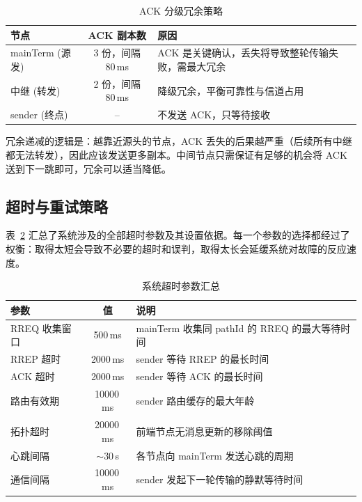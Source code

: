 \documentclass[12pt,a4paper]{ctexart}
\newcommand{\tblheaderstyle}{\sffamily\small\color{white}}
\begin{document}
\begin{table}[htbp]
\centering
\caption{ACK 分级冗余策略}
\label{tab:ackredundancy}
\begin{tabularx}{\textwidth}{l c >{\raggedright\arraybackslash}X}
\toprule
\rowcolor{tblhead}\tblheaderstyle 节点 & \tblheaderstyle ACK 副本数 & \tblheaderstyle 原因 \\
\midrule
mainTerm (源发) & 3 份，间隔 80\,ms & ACK 是关键确认，丢失将导致整轮传输失败，需最大冗余 \\
中继 (转发)    & 2 份，间隔 80\,ms & 降级冗余，平衡可靠性与信道占用 \\
sender (终点)  & --                & 不发送 ACK，只等待接收 \\
\bottomrule
\end{tabularx}
\end{table}

冗余递减的逻辑是：越靠近源头的节点，ACK 丢失的后果越严重（后续所有中继都无法转发），因此应该发送更多副本。中间节点只需保证有足够的机会将 ACK 送到下一跳即可，冗余可以适当降低。

\subsection{超时与重试策略}

表~\ref{tab:timeouts} 汇总了系统涉及的全部超时参数及其设置依据。每一个参数的选择都经过了权衡：取得太短会导致不必要的超时和误判，取得太长会延缓系统对故障的反应速度。

\begin{table}[htbp]
\centering
\caption{系统超时参数汇总}
\label{tab:timeouts}
\begin{tabularx}{\textwidth}{l c >{\raggedright\arraybackslash}X}
\toprule
\rowcolor{tblhead}\tblheaderstyle 参数 & \tblheaderstyle 值 & \tblheaderstyle 说明 \\
\midrule
RREQ 收集窗口  & 500\,ms    & mainTerm 收集同 pathId 的 RREQ 的最大等待时间 \\
RREP 超时     & 2000\,ms   & sender 等待 RREP 的最长时间 \\
ACK 超时      & 2000\,ms   & sender 等待 ACK 的最长时间 \\
路由有效期     & 10000\,ms  & sender 路由缓存的最大年龄 \\
拓扑超时       & 20000\,ms  & 前端节点无消息更新的移除阈值 \\
心跳间隔       & $\sim$30\,s& 各节点向 mainTerm 发送心跳的周期 \\
通信间隔       & 10000\,ms  & sender 发起下一轮传输的静默等待时间 \\
\bottomrule
\end{tabularx}
\end{table}
\end{document}
